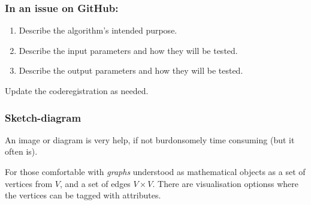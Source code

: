 \documentclass[
]{article}
\providecommand{\tightlist}{%
  \setlength{\itemsep}{0pt}\setlength{\parskip}{0pt}}
\begin{document}
\hypertarget{in-an-issue-on-github}{%
\subsubsection{In an issue on GitHub:}\label{in-an-issue-on-github}}

\begin{enumerate}
\def\labelenumi{\arabic{enumi}.}
\tightlist
\item
  Describe the algorithm's intended purpose.
\item
  Describe the input parameters and how they will be tested.
\item
  Describe the output parameters and how they will be tested.
\end{enumerate}

Update the coderegistration as needed.

\hypertarget{sketch-diagram}{%
\subsubsection{Sketch-diagram}\label{sketch-diagram}}

An image or diagram is very help, if not burdonsomely time consuming
(but it often is).

For those comfortable with \emph{graphs} understood as mathematical
objects as a set of vertices from \(V\), and a set of edges
\(V \times V\). There are visualisation optionss where the vertices can
be tagged with attributes.
\end{document}
